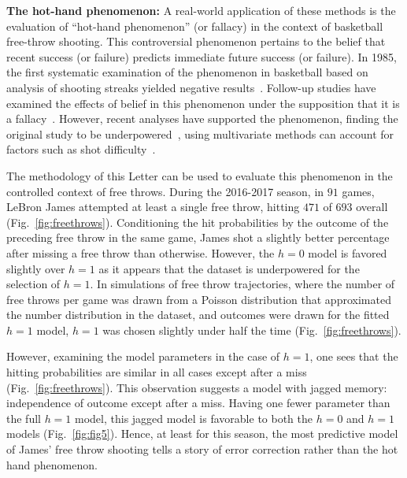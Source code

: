 \documentclass[prl,twocolumn,groupedaddress]{revtex4-1}
\begin{document}
\textbf{The hot-hand phenomenon:} 
A  real-world application of these methods is the evaluation of ``hot-hand phenomenon'' (or fallacy) in the context of basketball free-throw shooting. This controversial phenomenon pertains to the belief that recent success (or failure) predicts immediate future success (or failure).  In 1985, the first systematic examination of the phenomenon in basketball based on analysis of shooting streaks yielded negative results~\cite{gilovich1985hot}. Follow-up studies have examined the effects of belief in this phenomenon under the supposition that it is a fallacy~\cite{burns2001hot}. However, recent analyses have supported the phenomenon, finding the original study to be underpowered~\cite{arkes2010revisiting,miller2016surprised}, using multivariate methods can account for factors such as shot difficulty~\cite{bocskocsky2014hot,miller2016surprised}.

The methodology of this Letter can be used to evaluate this phenomenon in the controlled context of free throws.
  During the 2016-2017 season, in $91$ games, LeBron James attempted at least a single free throw, hitting $471$ of $693$ overall (Fig.~\ref{fig:freethrows}).  Conditioning the hit probabilities by the outcome of the preceding free throw in the same game, James shot a slightly better percentage after missing a free throw than otherwise. However, the $h=0$ model is favored slightly over $h=1$ as it appears that the dataset is underpowered for the selection of $h=1$. In simulations of free throw trajectories, where the number of free throws per game was drawn from a Poisson distribution that approximated the number distribution in the dataset, and outcomes were drawn for the fitted $h=1$ model, $h=1$ was chosen slightly under half the time (Fig.~\ref{fig:freethrows}).
  
  However, examining the model parameters in the case of $h=1$, one sees that the hitting probabilities are similar in all cases except after a miss (Fig.~\ref{fig:freethrows}). This observation suggests  a  model with jagged memory: independence of outcome except after a miss. Having one fewer parameter than the full $h=1$ model, this jagged model is favorable to both the $h=0$ and $h=1$ models (Fig.~\ref{fig:fig5}). Hence, at least for this season, the most predictive model of  James' free throw shooting tells a story of error correction rather than the hot hand phenomenon.
  
\end{document}
